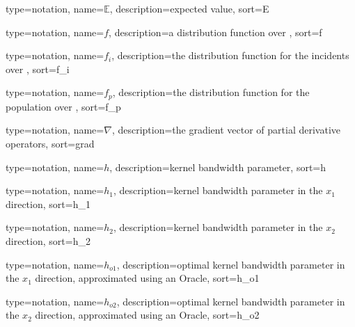 

{%
   type=notation,
   name={\ensuremath{\mathbb{E}}},
   description={expected value},
   sort={E}
}

{%
   type=notation,
   name={\ensuremath{f}},
   description={a distribution function over },
   sort={f}
}

{%
   type=notation,
   name={\ensuremath{f_i}},
   description={the distribution function for the incidents over },
   sort={f_i}
}

{%
   type=notation,
   name={\ensuremath{f_p}},
   description={the distribution function for the population over },
   sort={f_p}
}

{%
   type=notation,
   name={\ensuremath{\nabla}},
   description={the gradient vector of partial derivative operators},
   sort={grad}
}

{%
   type=notation,
   name={\ensuremath{h}},
   description={kernel bandwidth parameter},
   sort={h}
}

{%
   type=notation,
   name={\ensuremath{h_1}},
   description={kernel bandwidth parameter in the \ensuremath{x_1} direction},
   sort={h_1}
}

{%
   type=notation,
   name={\ensuremath{h_2}},
   description={kernel bandwidth parameter in the \ensuremath{x_2} direction},
   sort={h_2}
}

{%
   type=notation,
   name={\ensuremath{h_{o1}}},
   description={optimal kernel bandwidth parameter in the \ensuremath{x_1} direction, approximated using an Oracle},
   sort={h_o1}
}

{%
   type=notation,
   name={\ensuremath{h_{o2}}},
   description={optimal kernel bandwidth parameter in the \ensuremath{x_2} direction, approximated using an Oracle},
   sort={h_o2}
}

